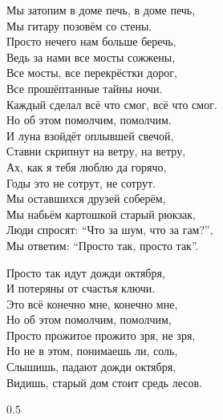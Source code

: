 \documentclass[fleqn,a5paper,12pt,twoside]{guitartabs}
\begin{document}
    \-\hspace{3mm}Мы затопим в доме печь, в доме печь, \\
    \-\hspace{3mm}Мы гитару позовём со стены.\\
    \-\hspace{3mm}Просто нечего нам больше беречь,\\
    \-\hspace{3mm}Ведь за нами все мосты сожжены,\\
    \-\hspace{3mm}Все мосты, все перекрёстки дорог,\\
    \-\hspace{3mm}Все прошёптанные тайны ночи.\\
    \-\hspace{3mm}Каждый сделал всё что смог, всё что смог.\\
    \-\hspace{3mm}Но об этом помолчим, помолчим.\\
    \newpage
    И луна взойдёт оплывшей свечой,\\
    Ставни скрипнут на ветру, на ветру,\\
    Ах, как я тебя люблю да горячо,\\
    Годы это не сотрут, не сотрут.\\
    Мы оставшихся друзей соберём,\\
    Мы набьём картошкой старый рюкзак,\\
    Люди спросят: ``Что за шум, что за гам?'',\\
    Мы ответим: ``Просто так, просто так''.

    \-\hspace{3mm}Просто так идут дожди октября,\\
    \-\hspace{3mm}И потеряны от счастья ключи.\\
    \-\hspace{3mm}Это всё конечно мне, конечно мне,\\
    \-\hspace{3mm}Но об этом помолчим, помолчим,\\
    \-\hspace{3mm}Просто прожитое прожито зря, не зря,\\
    \-\hspace{3mm}Но не в этом, понимаешь ли, соль,\\
    \-\hspace{3mm}Слышишь, падают дожди октября,\\
    \-\hspace{3mm}Видишь, старый дом стоит средь лесов.\begin{spacing}{0.5}
    \end{spacing}
\newpage
{}%
\end{document}
